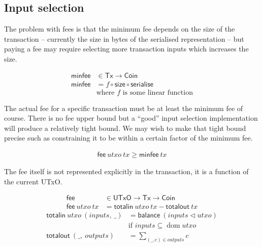 \documentclass{article}
\DeclareMathOperator{\dom}{dom}
\newcommand{\restrictdom}{\lhd}
\begin{document}
\subsection{Input selection}

The problem with fees is that the minimum fee depends on the size of the transaction
-- currently the size in bytes of the serialised representation -- but paying a
fee may require selecting more transaction inputs which increases the size.

\begin{equation}
\begin{split}
\mathsf{minfee} & \in \mathsf{Tx} \to \mathsf{Coin} \\
\mathsf{minfee} & = f \circ \mathsf{size} \circ \mathsf{serialise} \\
             & \text{where } f \text{ is some linear function}
\end{split}
\end{equation}

The actual fee for a specific transaction must be at least the minimum fee of
course. There is no fee upper bound but a ``good'' input selection
implementation will produce a relatively tight bound. We may wish to make that
tight bound precise such as constraining it to be within a certain factor of
the minimum fee.

\begin{equation}
\begin{split}
\mathsf{fee} ~ utxo ~ tx \geq \mathsf{minfee} ~ tx
\end{split}
\end{equation}

The fee itself is not represented explicitly in the transaction, it is a
function of the current UTxO.

\begin{equation}
\begin{split}
\mathsf{fee} & \in \mathsf{UTxO} \to \mathsf{Tx} \to \mathsf{Coin} \\
\mathsf{fee} ~ utxo ~ tx & = \mathsf{totalin} ~ utxo ~ tx - \mathsf{totalout} ~ tx
\end{split}
\end{equation}
%
\begin{equation}
\begin{split}
\mathsf{totalin} ~ utxo ~ (inputs, ~ \_) & = \mathsf{balance} ~ (inputs \restrictdom utxo) \\
                 & \text{if } inputs \subseteq \dom utxo \\
\mathsf{totalout} ~ (\_, ~ outputs) & = \sum_{(\_, c) \in outputs} c \\
\end{split}
\end{equation}
\end{document}
